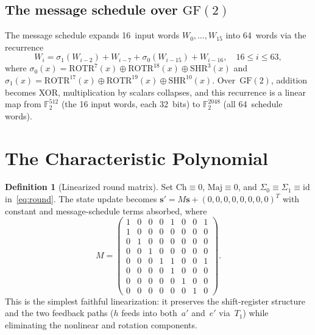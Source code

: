 \documentclass[12pt, a4paper]{article}
\theoremstyle{plain}
\theoremstyle{definition}
\newtheorem{definition}[theorem]{Definition}
\newcommand{\F}{\mathbb{F}}
\newcommand{\GF}{\mathrm{GF}}
\newcommand{\Ch}{\mathrm{Ch}}
\newcommand{\Maj}{\mathrm{Maj}}
\newcommand{\rotr}{\mathrm{ROTR}}
\newcommand{\shr}{\mathrm{SHR}}
\begin{document}
\subsection{The message schedule over \texorpdfstring{$\GF(2)$}{GF(2)}}

The message schedule expands 16~input words $W_{0},\ldots,W_{15}$
into 64~words via the recurrence
\begin{equation}\label{eq:msg-schedule}
  W_{i} = \sigma_{1}(W_{i-2}) + W_{i-7} + \sigma_{0}(W_{i-15})
         + W_{i-16},
  \quad 16\le i\le 63,
\end{equation}
where $\sigma_{0}(x)=\rotr^{7}(x)\oplus\rotr^{18}(x)\oplus\shr^{3}(x)$
and $\sigma_{1}(x)=\rotr^{17}(x)\oplus\rotr^{19}(x)\oplus\shr^{10}(x)$.
Over~$\GF(2)$, addition becomes XOR, multiplication by scalars
collapses, and this recurrence is a linear map from $\F_{2}^{512}$
(the 16 input words, each 32~bits) to $\F_{2}^{2048}$
(all 64~schedule words).

\section{The Characteristic Polynomial}\label{sec:charpoly}

\begin{definition}[Linearized round matrix]\label{def:M}
Set $\Ch\equiv 0$, $\Maj\equiv 0$, and $\Sigma_{0}\equiv\Sigma_{1}\equiv\mathrm{id}$
in~\eqref{eq:round}.
The state update becomes
$\mathbf{s}'=M\mathbf{s}+(0,0,0,0,0,0,0,0)^{T}$ with constant and
message-schedule terms absorbed, where
\begin{equation}\label{eq:M}
  M = \begin{pmatrix}
    1 & 0 & 0 & 0 & 1 & 0 & 0 & 1\\
    1 & 0 & 0 & 0 & 0 & 0 & 0 & 0\\
    0 & 1 & 0 & 0 & 0 & 0 & 0 & 0\\
    0 & 0 & 1 & 0 & 0 & 0 & 0 & 0\\
    0 & 0 & 0 & 1 & 1 & 0 & 0 & 1\\
    0 & 0 & 0 & 0 & 1 & 0 & 0 & 0\\
    0 & 0 & 0 & 0 & 0 & 1 & 0 & 0\\
    0 & 0 & 0 & 0 & 0 & 0 & 1 & 0
  \end{pmatrix}.
\end{equation}
This is the simplest faithful linearization: it preserves the
shift-register structure and the two feedback paths ($h$ feeds
into both~$a'$ and~$e'$ via~$T_{1}$) while eliminating the
nonlinear and rotation components.
\end{definition}
\end{document}
